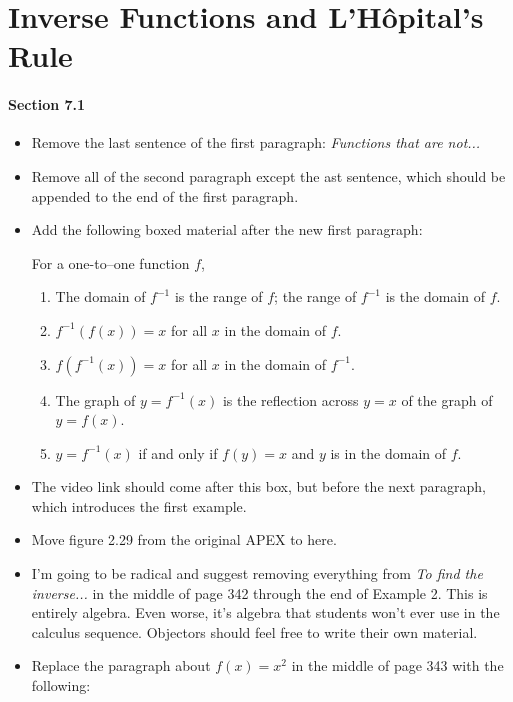 \documentclass[12pt]{report}
\begin{document}
\section*{Inverse Functions and L'H\^opital's Rule}

\paragraph{Section 7.1}

\begin{itemize}
\item Remove the last sentence of the first paragraph: \emph{Functions that are not...} 

\item Remove all of the second paragraph except the ast sentence, which should be appended to the end of the first paragraph.

\item Add the following boxed material after the new first paragraph:

For a one-to--one function $f$, 
\begin{enumerate}
\item The domain of $f^{-1}$ is the range of $f$; the range of $f^{-1}$ is the domain of $f$.
\item $f^{-1}(f(x))=x$ for all $x$ in the domain of $f$.
\item $f(f^{-1}(x))=x$ for all $x$ in the domain of $f^{-1}$.
\item The graph of $y=f^{-1}(x)$ is the reflection across $y=x$ of the graph of $y=f(x)$. 
\item $y=f^{-1}(x)$ if and only if $f(y)=x$ and $y$ is in the domain of $f$.
\end{enumerate}

\item The video link should come after this box, but before the next paragraph, which introduces the first example.

\item Move figure 2.29 from the original APEX to here.

\item I'm going to be radical and suggest removing everything from \emph{To find the inverse...} in the middle of page 342 through the end of Example 2. This is entirely algebra. Even worse, it's algebra that students won't ever use in the calculus sequence. Objectors should feel free to write their own material.

\item Replace the paragraph about $f(x)=x^2$ in the middle of page 343 with the following:


\end{itemize}
\end{document}
